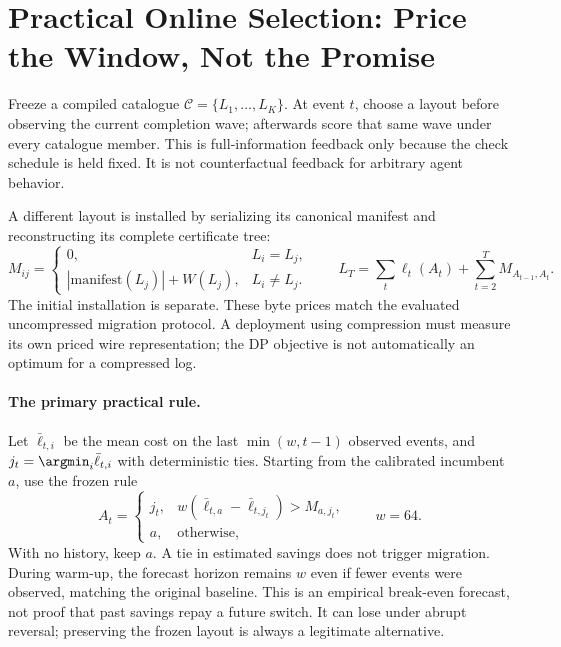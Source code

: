 \section{Practical Online Selection: Price the Window, Not the Promise}\label{sec:online}
Freeze a compiled catalogue $\mathcal C=\{L_1,\ldots,L_K\}$. At event $t$, choose
a layout before observing the current completion wave; afterwards score that same
wave under every catalogue member. This is full-information feedback only because
the check schedule is held fixed. It is not counterfactual feedback for arbitrary
agent behavior.

A different layout is installed by serializing its canonical manifest and
reconstructing its complete certificate tree:
\begin{equation}M_{ij}=\begin{cases}0,&L_i=L_j,\\ |\mathrm{manifest}(L_j)|+W(L_j),&L_i\ne L_j.\end{cases}
\qquad L_T=\sum_{t}\ell_t(A_t)+\sum_{t=2}^{T}M_{A_{t-1},A_t}.\label{eq:mig}\end{equation}
The initial installation is separate. These byte prices match the evaluated
uncompressed migration protocol. A deployment using compression must measure its
own priced wire representation; the DP objective is not automatically an optimum
for a compressed log.

\paragraph{The primary practical rule.}
Let $\bar\ell_{t,i}$ be the mean cost on the last $\min(w,t-1)$ observed events,
and $j_t=\argmin_i\bar\ell_{t,i}$ with deterministic ties. Starting from the
calibrated incumbent $a$, use the frozen rule
\begin{equation}A_t=\begin{cases} j_t,& w(\bar\ell_{t,a}-\bar\ell_{t,j_t})>M_{a,j_t},\\ a,&\text{otherwise},\end{cases}\qquad w=64.\label{eq:window}\end{equation}
With no history, keep $a$. A tie in estimated savings does not trigger migration.
During warm-up, the forecast horizon remains $w$ even if fewer events were
observed, matching the original baseline. This is an empirical break-even
forecast, not proof that past savings repay a future switch. It can lose under
abrupt reversal; preserving the frozen layout is always a legitimate alternative.

